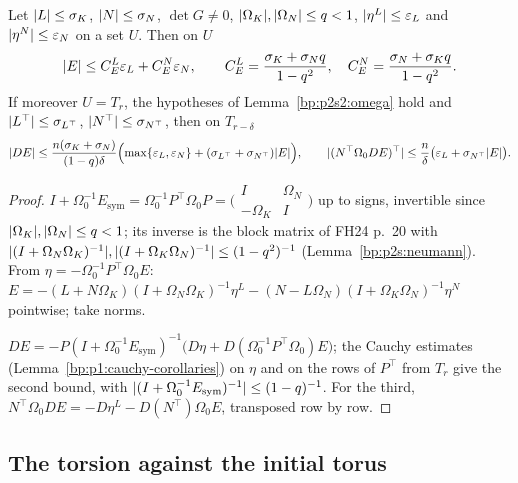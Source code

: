 \begin{lemma}\label{bp:p2s2:recovery}
Let $\lvert L\rvert\le\sigma_K$, $\lvert N\rvert\le\sigma_N$, $\det G\ne0$, $\lvert \Omega_K\rvert,\lvert \Omega_N\rvert\le q<1$, $\lvert \eta^L\rvert\le\varepsilon_L$ and $\lvert \eta^N\rvert\le\varepsilon_N$ on a set
$U$. Then on $U$
\[
\lvert E\rvert\le C^L_E\varepsilon_L+C^N_E\varepsilon_N,\qquad C^L_E=\frac{\sigma_K+\sigma_Nq}{1-q^2},\quad C^N_E=\frac{\sigma_N+\sigma_Kq}{1-q^2}.
\]
If moreover $U=T_r$, the hypotheses of Lemma~\ref{bp:p2s2:omega} hold and $\lvert L^\top\rvert\le\sigma_{L^\top}$, $\lvert N^\top\rvert\le\sigma_{N^\top}$, then on $T_{r-\delta}$
\[
\lvert DE\rvert\le\frac{n(\sigma_K+\sigma_N)}{(1-q)\delta}\Bigl(\max\{\varepsilon_L,\varepsilon_N\}+(\sigma_{L^\top}+\sigma_{N^\top})\lvert E\rvert\Bigr),\qquad
\lvert (N^\top\Omega_0DE)^\top\rvert\le\frac n\delta\bigl(\varepsilon_L+\sigma_{N^\top}\lvert E\rvert\bigr).
\]
\end{lemma}

\begin{proof}
\label{step:p2s2:rec-e}
$I+\Omega_0^{-1}E_{\mathrm{sym}}=\Omega_0^{-1}P^\top\Omega_0P=\bigl(\begin{smallmatrix}I&\Omega_N\\-\Omega_K&I\end{smallmatrix}\bigr)$ up to signs, invertible since
$\lvert \Omega_K\rvert,\lvert \Omega_N\rvert\le q<1$; its inverse is the block matrix of FH24 p.~20 with
$\lvert (I+\Omega_N\Omega_K)^{-1}\rvert,\lvert (I+\Omega_K\Omega_N)^{-1}\rvert\le(1-q^2)^{-1}$ (Lemma~\ref{bp:p2s:neumann}). From $\eta=-\Omega_0^{-1}P^\top\Omega_0E$:
$E=-(L+N\Omega_K)(I+\Omega_N\Omega_K)^{-1}\eta^L-(N-L\Omega_N)(I+\Omega_K\Omega_N)^{-1}\eta^N$ pointwise; take norms.

\label{step:p2s2:rec-de}
$DE=-P(I+\Omega_0^{-1}E_{\mathrm{sym}})^{-1}\bigl(D\eta+D(\Omega_0^{-1}P^\top\Omega_0)E\bigr)$; the Cauchy estimates
(Lemma~\ref{bp:p1:cauchy-corollaries}) on $\eta$ and on the rows of $P^\top$ from $T_r$ give the second bound, with $\lvert (I+\Omega_0^{-1}E_{\mathrm{sym}})^{-1}\rvert\le(1-q)^{-1}$.
For the third, $N^\top\Omega_0DE=-D\eta^L-D(N^\top)\Omega_0E$, transposed row by row.
\end{proof}

\subsection{The torsion against the initial torus}\label{bp:p2s2:sec-tor}

